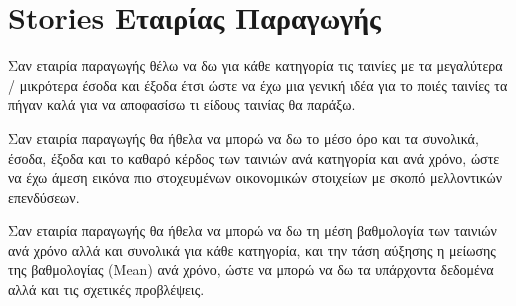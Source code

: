 \section{Stories Εταιρίας Παραγωγής}
\begin{tcolorbox}[colback=fg!10!white,colframe=pcbg!100!white,
	title=1η ιστορία]
Σαν εταιρία παραγωγής θέλω να δω για κάθε κατηγορία τις ταινίες με τα μεγαλύτερα / μικρότερα έσοδα και έξοδα έτσι ώστε να έχω μια γενική ιδέα για το ποιές ταινίες τα πήγαν καλά για να αποφασίσω τι είδους ταινίας θα παράξω.
\end{tcolorbox}

\begin{tcolorbox}[colback=fg!10!white,colframe=pcbg!100!white,
	title=2η ιστορία]
Σαν εταιρία παραγωγής θα ήθελα να μπορώ να δω το μέσο όρο και τα συνολικά, έσοδα, έξοδα και το καθαρό κέρδος των ταινιών ανά κατηγορία και ανά χρόνο, ώστε να έχω άμεση εικόνα πιο στοχευμένων οικονομικών στοιχείων με σκοπό μελλοντικών επενδύσεων.
\end{tcolorbox}

\begin{tcolorbox}[colback=fg!10!white,colframe=pcbg!100!white,
	title=3η ιστορία]
Σαν εταιρία παραγωγής θα ήθελα να μπορώ να δω τη μέση βαθμολογία των ταινιών ανά χρόνο αλλά και συνολικά για κάθε κατηγορία, και την τάση αύξησης η μείωσης της βαθμολογίας (Mean) ανά χρόνο, ώστε να μπορώ να δω τα υπάρχοντα δεδομένα αλλά και τις σχετικές προβλέψεις.
\end{tcolorbox}

